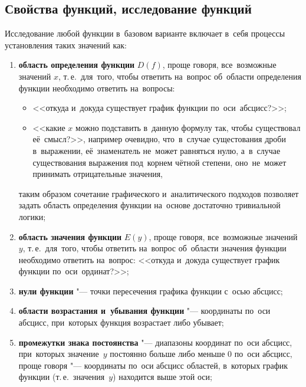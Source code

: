 \documentclass[]{scrartcl}
\begin{document}
{{\subsection{Свойства функций, исследование функций}
Исследование любой функции в~базовом варианте включает в~себя процессы установления таких значений как:
\begin{enumerate}
	\item \textbf{область определения функции} ${\textstyle D(f)}$, проще говоря, все~возможные значений ${\textstyle x}$, т.\,е.~для~того, чтобы ответить на~вопрос об~области определения функции необходимо ответить на~вопросы:
	\begin{itemize}
		\item  <<откуда и~докуда существует график функции по~оси~абсцисс?>>;
		\item <<какие ${\textstyle x}$ можно подставить в~данную формулу так, чтобы существовал её~смысл?>>, например очевидно, что~в~случае сущестования дроби в~выражении, её~знаменатель не~может равняться нулю, а~в~случае существования выражения под~корнем чётной степени, оно~не~может принимать отрицательные значения,
	\end{itemize}
	таким образом сочетание графического и~аналитического подходов позволяет задать область определения функции на~основе достаточно тривиальной логики;
	\item \textbf{область значения функции} ${\textstyle E(y)}$, проще говоря, все~возможные значений ${\textstyle y}$, т.\,е.~для~того, чтобы ответить на~вопрос об~области значения функции необходимо ответить на~вопрос: <<откуда и~докуда существует график функции по~оси~ординат?>>;
	\item \textbf{нули функции} "--- точки пересечения графика функции с~осью абсцисс;
	\item \textbf{области возрастания и~убывания функции} "--- координаты по~оси абсцисс, при~которых функция возрастает либо убывает;
	\item \textbf{промежутки знака постоянства} "--- диапазоны координат по~оси абсцисс, при~которых значение~${\textstyle y}$ постоянно больше либо меньше ${\textstyle 0}$ по~оси абсцисс, проще говоря "--- координаты по~оси абсцисс областей, в~которых график функции (т.\,е.~значения~${\textstyle y}$) находится выше этой оси;

\end{enumerate}}}
\end{document}
